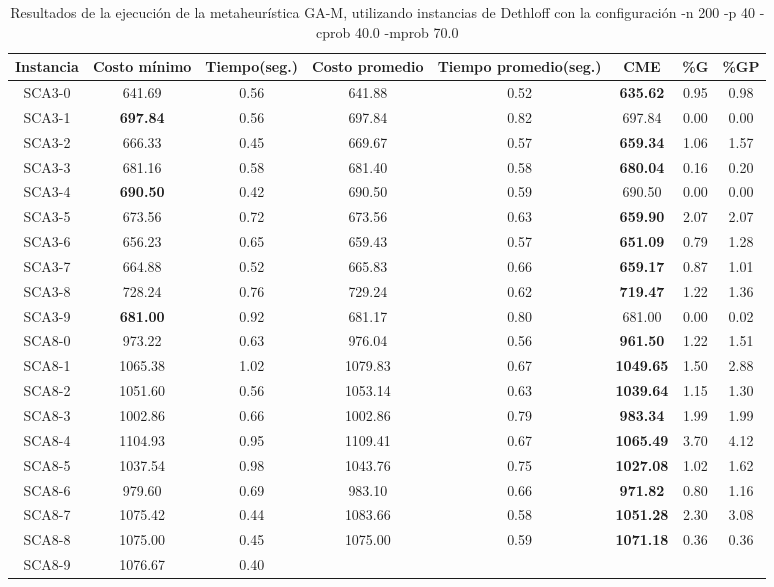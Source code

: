 \begin{table}[ht]
\caption{Resultados de la ejecución de la metaheurística GA-M, utilizando instancias de Dethloff con la configuración -n 200 -p 40 -cprob 40.0 -mprob 70.0}
\centering
\small
\begin{tabular}{c c c c c c c c}
\hline\hline
Instancia & Costo mínimo & Tiempo(seg.) & Costo promedio & Tiempo promedio(seg.) & CME & \%G & \%GP \\ [0.5ex]
\hline
SCA3-0 & 641.69 & 0.56 & 
641.88 & 0.52 & \bf{635.62} & 
0.95 & 0.98\\SCA3-1 & \bf{697.84} & 0.56 & 
697.84 & 0.82 & 697.84 & 0.00
 & 0.00\\
SCA3-2 & 666.33 & 0.45 & 
669.67 & 0.57 & \bf{659.34} & 
1.06 & 1.57\\SCA3-3 & 681.16 & 0.58 & 
681.40 & 0.58 & \bf{680.04} & 
0.16 & 0.20\\SCA3-4 & \bf{690.50} & 0.42 & 
690.50 & 0.59 & 690.50 & 0.00
 & 0.00\\
SCA3-5 & 673.56 & 0.72 & 
673.56 & 0.63 & \bf{659.90} & 
2.07 & 2.07\\SCA3-6 & 656.23 & 0.65 & 
659.43 & 0.57 & \bf{651.09} & 
0.79 & 1.28\\SCA3-7 & 664.88 & 0.52 & 
665.83 & 0.66 & \bf{659.17} & 
0.87 & 1.01\\SCA3-8 & 728.24 & 0.76 & 
729.24 & 0.62 & \bf{719.47} & 
1.22 & 1.36\\SCA3-9 & \bf{681.00} & 0.92 & 
681.17 & 0.80 & 681.00 & 0.00
 & 0.02\\SCA8-0 & 973.22 & 0.63 & 
976.04 & 0.56 & \bf{961.50} & 
1.22 & 1.51\\SCA8-1 & 1065.38 & 1.02 & 
1079.83 & 0.67 & \bf{1049.65} & 
1.50 & 2.88\\SCA8-2 & 1051.60 & 0.56 & 
1053.14 & 0.63 & \bf{1039.64} & 
1.15 & 1.30\\SCA8-3 & 1002.86 & 0.66 & 
1002.86 & 0.79 & \bf{983.34} & 
1.99 & 1.99\\SCA8-4 & 1104.93 & 0.95 & 
1109.41 & 0.67 & \bf{1065.49} & 
3.70 & 4.12\\SCA8-5 & 1037.54 & 0.98 & 
1043.76 & 0.75 & \bf{1027.08} & 
1.02 & 1.62\\SCA8-6 & 979.60 & 0.69 & 
983.10 & 0.66 & \bf{971.82} & 
0.80 & 1.16\\SCA8-7 & 1075.42 & 0.44 & 
1083.66 & 0.58 & \bf{1051.28} & 
2.30 & 3.08\\SCA8-8 & 1075.00 & 0.45 & 
1075.00 & 0.59 & \bf{1071.18} & 
0.36 & 0.36\\SCA8-9 & 1076.67 & 0.40 & 

\end{tabular}
\end{table}
